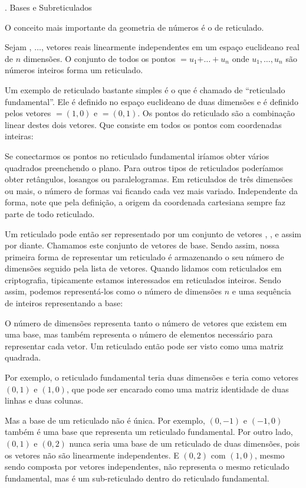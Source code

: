 {\tenbold{}. Bases e Subreticulados}

O conceito mais importante da geometria de números é o de reticulado.

Sejam , $\ldots$,  vetores reais linearmente
independentes em um espaço euclideano real de $n$ dimensões. O
conjunto de todos os pontos
$=u_1$$+\ldots+u_n$ onde $u_1, \ldots,
u_n$ são números inteiros forma um reticulado.

Um exemplo de reticulado bastante simples é o que é chamado de
``reticulado fundamental''. Ele é definido no espaço euclideano de
duas dimensões e é definido pelos vetores $=(1, 0)$ e
$=(0,1)$. Os pontos do reticulado são a combinação linear
destes dois vetores. Que consiste em todos os pontos com coordenadas
inteiras:


Se conectarmos os pontos no reticulado fundamental iríamos obter
vários quadrados preenchendo o plano. Para outros tipos de reticulados
poderíamos obter retângulos, losangos ou paralelogramas. Em
reticulados de três dimensões ou mais, o número de formas vai ficando
cada vez mais variado. Independente da forma, note que pela definição,
a origem da coordenada cartesiana sempre faz parte de todo reticulado.

Um reticulado pode então ser representado por um conjunto de vetores
, , e assim por diante. Chamamos este conjunto de
vetores de base. Sendo assim, nossa primeira forma de representar um
reticulado é armazenando o seu número de dimensões seguido pela lista
de vetores. Quando lidamos com reticulados em criptografia,
tipicamente estamos interessados em reticulados inteiros. Sendo assim,
podemos representá-los como o número de dimensões $n$ e uma sequência
de inteiros representando a base:


O número de dimensões representa tanto o número de vetores que existem
em uma base, mas também representa o número de elementos necessário
para representar cada vetor. Um reticulado então pode ser visto como
uma matriz quadrada.

Por exemplo, o reticulado fundamental teria duas dimensões e teria
como vetores $(0, 1)$ e $(1, 0)$, que pode ser encarado como uma
matriz identidade de duas linhas e duas colunas.

Mas a base de um reticulado não é única. Por exemplo, $(0, -1)$ e
$(-1, 0)$ também é uma base que representa um reticulado
fundamental. Por outro lado, $(0, 1)$ e $(0,2)$ nunca seria uma base
de um reticulado de duas dimensões, pois os vetores não são
linearmente independentes. E $(0, 2)$ com $(1, 0)$, mesmo sendo
composta por vetores independentes, não representa o mesmo reticulado
fundamental, mas é um sub-reticulado dentro do reticulado
fundamental.

